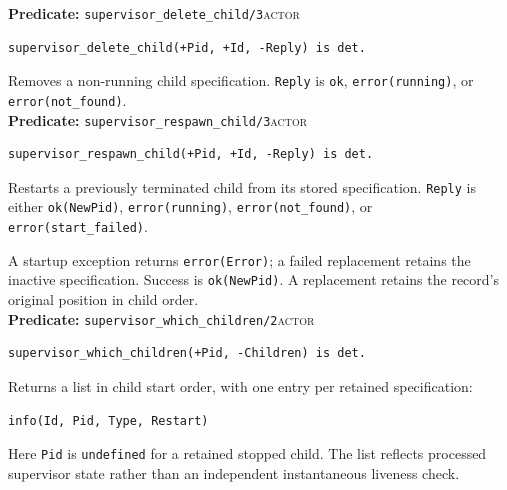 \noindent \textbf{Predicate:} \texttt{supervisor\_\allowbreak{}delete\_\allowbreak{}child/\allowbreak{}3}\hfill\textsc{actor}

\begin{verbatim}
supervisor_delete_child(+Pid, +Id, -Reply) is det.
\end{verbatim}

\noindent Removes a non-running child specification. \texttt{Reply} is
\texttt{ok}, \texttt{error(\allowbreak{}running)}, or \texttt{error(\allowbreak{}not\_\allowbreak{}found)}.\\


\noindent \textbf{Predicate:} \texttt{supervisor\_\allowbreak{}respawn\_\allowbreak{}child/\allowbreak{}3}\hfill\textsc{actor}

\begin{verbatim}
supervisor_respawn_child(+Pid, +Id, -Reply) is det.
\end{verbatim}

Restarts a previously terminated child from its stored specification. \texttt{Reply} is either
\texttt{ok(\allowbreak{}NewPid)}, \texttt{error(\allowbreak{}running)}, \texttt{error(\allowbreak{}not\_\allowbreak{}found)}, or
\texttt{error(\allowbreak{}start\_\allowbreak{}failed)}.

A startup exception returns \texttt{error(\allowbreak{}Error)}; a failed replacement retains the inactive
specification. Success is \texttt{ok(NewPid)}. A replacement retains the
record's original position in child order.\\


\noindent \textbf{Predicate:} \texttt{supervisor\_\allowbreak{}which\_\allowbreak{}children/\allowbreak{}2}\hfill\textsc{actor}

\begin{verbatim}
supervisor_which_children(+Pid, -Children) is det.
\end{verbatim}

\noindent Returns a list in child start order, with one entry per retained specification:

\begin{verbatim}
info(Id, Pid, Type, Restart)
\end{verbatim}

\noindent Here \texttt{Pid} is \texttt{undefined} for a retained stopped
child. The list reflects processed supervisor state rather than an independent
instantaneous liveness check.\\

